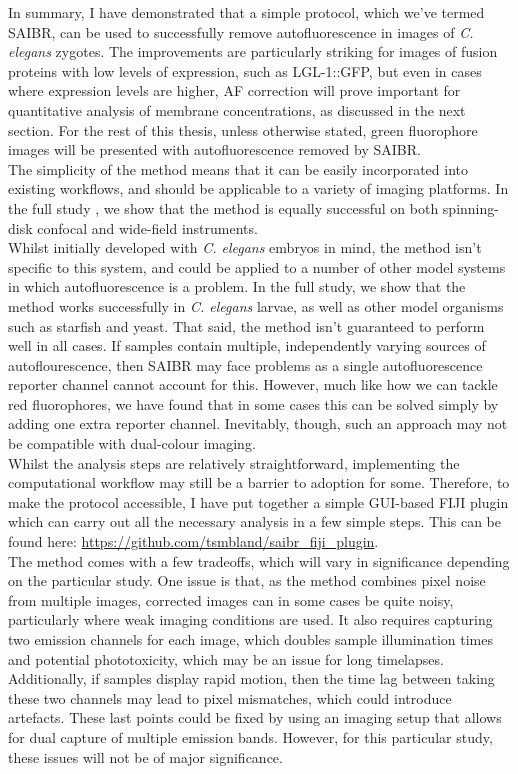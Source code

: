 \documentclass[12pt]{"report"}
\begin{document}
In summary, I have demonstrated that a simple protocol, which we’ve termed SAIBR, can be used to successfully remove autofluorescence in images of \textit{C. elegans} zygotes. The improvements are particularly striking for images of fusion proteins with low levels of expression, such as LGL-1::GFP, but even in cases where expression levels are higher, AF correction will prove important for quantitative analysis of membrane concentrations, as discussed in the next section. For the rest of this thesis, unless otherwise stated, green fluorophore images will be presented with autofluorescence removed by SAIBR.\\

The simplicity of the method means that it can be easily incorporated into existing workflows, and should be applicable to a variety of imaging platforms. In the full study \citep{Rodrigues2022}, we show that the method is equally successful on both spinning-disk confocal and wide-field instruments. \\

Whilst initially developed with \textit{C. elegans} embryos in mind, the method isn't specific to this system, and could be applied to a number of other model systems in which autofluorescence is a problem. In the full study, we show that the method works successfully in \textit{C. elegans} larvae, as well as other model organisms such as starfish and yeast. That said, the method isn’t guaranteed to perform well in all cases. If samples contain multiple, independently varying sources of autoflourescence, then SAIBR may face problems as a single autofluorescence reporter channel cannot account for this. However, much like how we can tackle red fluorophores, we have found that in some cases this can be solved simply by adding one extra reporter channel. Inevitably, though, such an approach may not be compatible with dual-colour imaging. \\

Whilst the analysis steps are relatively straightforward, implementing the computational workflow may still be a barrier to adoption for some. Therefore, to make the protocol accessible, I have put together a simple GUI-based FIJI plugin which can carry out all the necessary analysis in a few simple steps. This can be found here: \url{https://github.com/tsmbland/saibr_fiji_plugin}. \\

The method comes with a few tradeoffs, which will vary in significance depending on the particular study. One issue is that, as the method combines pixel noise from multiple images, corrected images can in some cases be quite noisy, particularly where weak imaging conditions are used. It also requires capturing two emission channels for each image, which doubles sample illumination times and potential phototoxicity, which may be an issue for long timelapses. Additionally, if samples display rapid motion, then the time lag between taking these two channels may lead to pixel mismatches, which could introduce artefacts. These last points could be fixed by using an imaging setup that allows for dual capture of multiple emission bands. However, for this particular study, these issues will not be of major significance. \\
\end{document}
